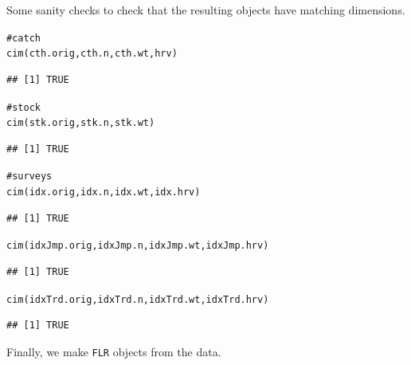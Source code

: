 \documentclass[a4paper,english,10pt]{article}\usepackage[]{graphicx}\usepackage[]{color}
\makeatletter
\newcommand{\hlcom}[1]{\textcolor[rgb]{0.2,0.267,0.4}{#1}}%
\newcommand{\hlstd}[1]{\textcolor[rgb]{0,0,0}{#1}}%
\newcommand{\hlkwd}[1]{\textcolor[rgb]{0.361,0.506,0.596}{#1}}%
\newenvironment{kframe}{%
 \def\at@end@of@kframe{}%
 \ifinner\ifhmode%
  \def\at@end@of@kframe{\end{minipage}}%
  \begin{minipage}{\columnwidth}%
 \fi\fi%
 \def\FrameCommand##1{\hskip\@totalleftmargin \hskip-\fboxsep
 \colorbox{shadecolor}{##1}\hskip-\fboxsep
     \hskip-\linewidth \hskip-\@totalleftmargin \hskip\columnwidth}%
 \MakeFramed {\advance\hsize-\width
   \@totalleftmargin\z@ \linewidth\hsize
   \@setminipage}}%
 {\par\unskip\endMakeFramed%
 \at@end@of@kframe}
\newenvironment{knitrout}{}{} %
\newcommand{\pkg}[1]{{\texttt{#1}}}
\makeatother
\begin{document}
Some sanity checks to check that the resulting objects have matching dimensions.

\begin{knitrout}
\color{fgcolor}\begin{kframe}
\begin{alltt}
\hlcom{# catch}
\hlkwd{cim}\hlstd{(cth.orig, cth.n, cth.wt, hrv)}
\end{alltt}
\begin{verbatim}
## [1] TRUE
\end{verbatim}
\begin{alltt}
\hlcom{# stock}
\hlkwd{cim}\hlstd{(stk.orig, stk.n, stk.wt)}
\end{alltt}
\begin{verbatim}
## [1] TRUE
\end{verbatim}
\begin{alltt}
\hlcom{# surveys}
\hlkwd{cim}\hlstd{(idx.orig, idx.n, idx.wt, idx.hrv)}
\end{alltt}
\begin{verbatim}
## [1] TRUE
\end{verbatim}
\begin{alltt}
\hlkwd{cim}\hlstd{(idxJmp.orig, idxJmp.n, idxJmp.wt, idxJmp.hrv)}
\end{alltt}
\begin{verbatim}
## [1] TRUE
\end{verbatim}
\begin{alltt}
\hlkwd{cim}\hlstd{(idxTrd.orig, idxTrd.n, idxTrd.wt, idxTrd.hrv)}
\end{alltt}
\begin{verbatim}
## [1] TRUE
\end{verbatim}
\end{kframe}
\end{knitrout}

Finally, we make \pkg{FLR} objects from the data.
\end{document}
